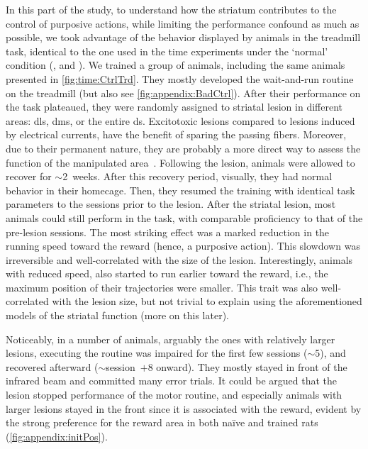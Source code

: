 \par
In this part of the study, to understand how the striatum contributes to the control of purposive actions, while limiting the performance confound as much as possible, we took advantage of the behavior displayed by animals in the treadmill task, identical to the one used in the time experiments under the `normal' condition (, and ).
We trained a group of animals, including the same animals presented in \autoref{fig:time:CtrlTrd}.
They mostly developed the wait-and-run routine on the treadmill (but also see \autoref{fig:appendix:BadCtrl}).
After their performance on the task plateaued, they were randomly assigned to striatal lesion in different areas:
    \gls{dls}, \gls{dms}, or the entire \gls{ds}.
Excitotoxic lesions compared to lesions induced by electrical currents, have the benefit of sparing the passing fibers.
Moreover, due to their permanent nature, they are probably a more direct way to assess the function of the manipulated area~\cite{Otchy2015Nature}.
Following the lesion, animals were allowed to recover for $\sim$2~weeks.
After this recovery period, visually, they had normal behavior in their homecage.
Then, they resumed the training with identical task parameters to the sessions prior to the lesion.
After the striatal lesion, most animals could still perform in the task, with comparable proficiency to that of the pre-lesion sessions.
The most striking effect was a marked reduction in the running speed toward the reward (hence, a purposive action).
This slowdown was irreversible and well-correlated with the size of the lesion.
Interestingly, animals with reduced speed, also started to run earlier toward the reward, i.e., the maximum position of their trajectories were smaller.
This trait was also well-correlated with the lesion size, but not trivial to explain using the aforementioned models of the striatal function (more on this later).
\par
Noticeably, in a number of animals, arguably the ones with relatively larger lesions, executing the routine was impaired for the first few sessions ($\sim$5), and recovered afterward ($\sim$session~$+8$ onward).
They mostly stayed in front of the infrared beam and committed many error trials.
It could be argued that the lesion stopped performance of the motor routine, and especially animals with larger lesions stayed in the front since it is associated with the reward, evident by the strong preference for the reward area in both na\"{i}ve and trained rats (\autoref{fig:appendix:initPos}).
